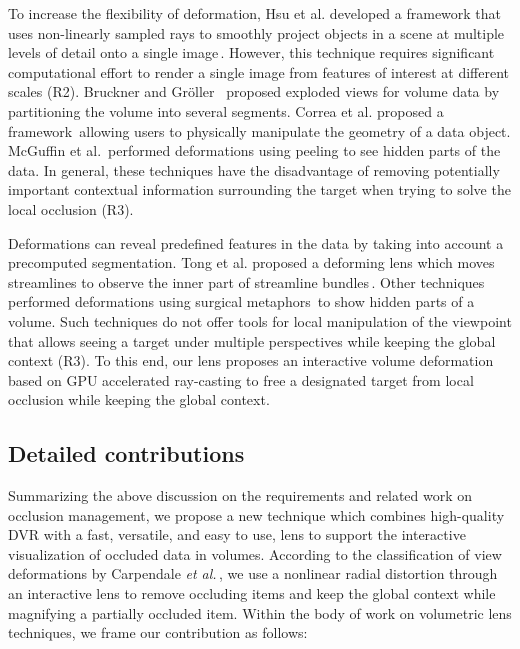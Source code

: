 To increase the flexibility of deformation, Hsu et al. developed a framework that uses non-linearly sampled rays to smoothly project objects in a scene at multiple levels of detail onto a single image\,\cite{Hsu:2011:RFM:2070781.2024165}. However, this technique requires significant computational effort to render a single image from features of interest at different scales (R2). Bruckner and Gr{\"o}ller~\cite{4015467} proposed exploded views for volume data by partitioning the volume into several segments. Correa et al. proposed a framework\,\cite{Correa:2007:IDD:1313046.1313163} allowing  users to physically manipulate the geometry of a data object. McGuffin et al.\,\cite{1250400} performed deformations using peeling to see hidden parts of the data. In general, these techniques have the disadvantage of removing potentially important contextual information surrounding the target when trying to solve the local occlusion (R3).

Deformations can reveal predefined features in the data by taking into account a precomputed segmentation. Tong et al. proposed a deforming lens which moves streamlines to observe the inner part of streamline bundles\,\cite{7332955}. Other techniques performed deformations using surgical metaphors\,\cite{4069230,Correa:2006:FAV:1187627.1187827} to show hidden parts of a volume. Such techniques do not offer tools for local manipulation of the viewpoint that allows seeing a target under multiple perspectives while keeping the global context (R3). To this end, our lens proposes an interactive volume deformation based on GPU accelerated ray-casting to free a designated target from local occlusion while keeping the global context.

\vspace{-0.15cm}
\subsection{Detailed contributions}
%
Summarizing the above discussion on the requirements and related work on occlusion management, we propose a new technique which combines high-quality DVR with a fast, versatile, and easy to use, lens to support the interactive visualization of occluded data in volumes. According to the classification of view deformations by Carpendale \emph{et al.}\,\cite{595268}, we use a nonlinear radial distortion through an interactive lens to remove occluding items and keep the global context while magnifying a partially occluded item. Within the body of work on volumetric lens techniques, we frame our contribution as follows:
 
